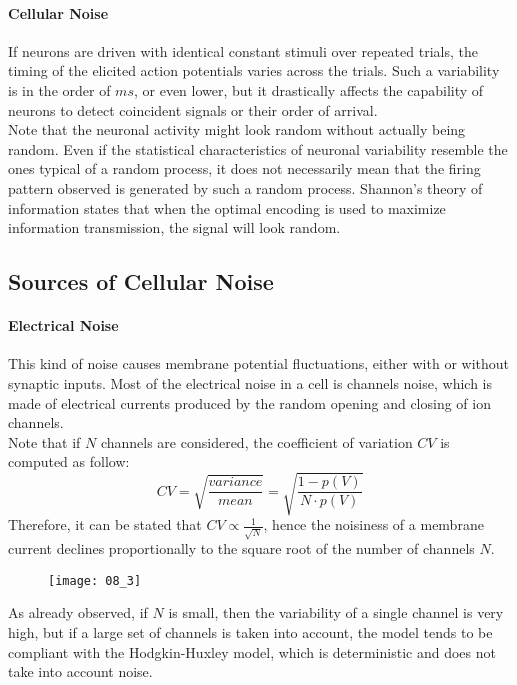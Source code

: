 \paragraph{Cellular Noise} If neurons are driven with identical constant stimuli over repeated
trials, the timing of the elicited action potentials varies across the trials. Such a variability
is in the order of \(ms\), or even lower, but it drastically affects the capability of neurons
to detect coincident signals or their order of arrival.\\
Note that the neuronal activity might look random without actually being random. Even if the
statistical characteristics of neuronal variability resemble the ones typical of a random process,
it does not necessarily mean that the firing pattern observed is generated by such a random process.
Shannon's theory of information states that when the optimal encoding is used to maximize information
transmission, the signal will look random.

\subsection{Sources of Cellular Noise}
\paragraph{Electrical Noise} This kind of noise causes membrane potential fluctuations, either with
or without synaptic inputs. Most of the electrical noise in a cell is channels noise, which is
made of electrical currents produced by the random opening and closing of ion channels.\\
Note that if \(N\) channels are considered, the coefficient of variation \(CV\) is computed
as follow:
\begin{equation*}
    CV=\sqrt{\frac{variance}{mean}}=\sqrt{\frac{1-p(V)}{N\cdot{p(V)}}}
\end{equation*}
Therefore, it can be stated that \(CV\propto{\frac{1}{\sqrt{N}}}\), hence the noisiness of a membrane current
declines proportionally to the square root of the number of channels \(N\).
\begin{figure}[H]
    \texttt{[image: 08\_3]}
    \centering
\end{figure}
As already observed, if \(N\) is small, then the variability of a single channel is very high, but if a large
set of channels is taken into account, the model tends to be compliant with the Hodgkin-Huxley model, which
is deterministic and does not take into account noise.
